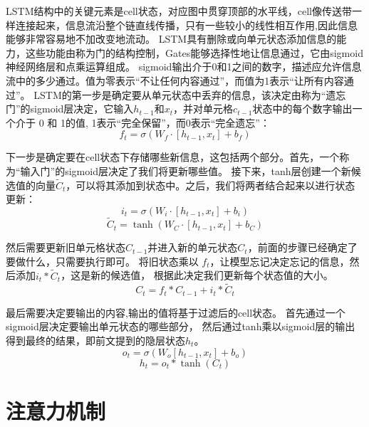 LSTM结构中的关键元素是cell状态，对应图中贯穿顶部的水平线，cell像传送带一样连接起来，信息流沿整个链直线传播，只有一些较小的线性相互作用,因此信息能够非常容易地不加改变地流动。
LSTM具有删除或向单元状态添加信息的能力，这些功能由称为门的结构控制，Gates能够选择性地让信息通过，它由sigmoid神经网络层和点乘运算组成。
sigmoid输出介于0和1之间的数字，描述应允许信息流中的多少通过。值为零表示“不让任何内容通过”，而值为1表示“让所有内容通过”。
LSTM的第一步是确定要从单元状态中丢弃的信息，该决定由称为“遗忘门”的sigmoid层决定，它输入$h_{t-1}$和$x_{t}$，并对单元格$c_{t-1}$状态中的每个数字输出一个介于 0 和 1的值,
1表示“完全保留”，而0表示“完全遗忘”：
\begin{equation}
  f_{t}=σ(W_{f}\cdot[h_{t-1},x_t]+b_{f})
  \end{equation}

  下一步是确定要在cell状态下存储哪些新信息，这包括两个部分。首先，一个称为“输入门”的sigmoid层决定了我们将更新哪些值。
  接下来，tanh层创建一个新候选值的向量$\tilde{C}_{t}$，可以将其添加到状态中。之后，我们将两者结合起来以进行状态更新：
  \begin{equation}
    i_{t} =\sigma\left(W_{i} \cdot\left[h_{t-1}, x_{t}\right]+b_{i}\right) 
  \end{equation}  
    \begin{equation}
      \tilde{C}_{t} =\tanh \left(W_{C} \cdot\left[h_{t-1}, x_{t}\right]+b_{C}\right)
      \end{equation}   

然后需要更新旧单元格状态$C_{t-1}$并进入新的单元状态$C_{t}$，前面的步骤已经确定了要做什么，只需要执行即可。
将旧状态乘以 $f_{t}$，让模型忘记决定忘记的信息，然后添加$i_{t} * \tilde{C}_{t}$，这是新的候选值，
根据此决定我们更新每个状态值的大小。
\begin{equation}
C_{t}=f_{t} * C_{t-1}+i_{t} * \tilde{C}_{t}
\end{equation} 

最后需要决定要输出的内容,输出的值将基于过滤后的cell状态。
首先通过一个sigmoid层决定要输出单元状态的哪些部分，
然后通过tanh乘以sigmoid层的输出得到最终的结果，即前文提到的隐层状态$h_{t}$。
\begin{equation}
  o_{t}=\sigma\left(W_{o}\left[h_{t-1}, x_{t}\right]+b_{o}\right)
\end{equation} 
\begin{equation}
  h_{t}=o_{t} * \tanh \left(C_{t}\right)
\end{equation}


\section{注意力机制}

